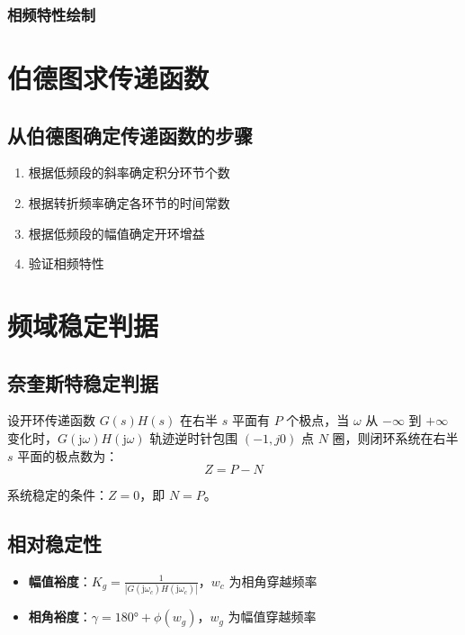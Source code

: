 \documentclass[12pt,a4paper]{article}
\newcommand{\jw}{\mathrm{j}\omega}
\begin{document}
\subsubsection{相频特性绘制}
\begin{center}
\end{center}

\section{伯德图求传递函数}

\subsection{从伯德图确定传递函数的步骤}
\begin{enumerate}
    \item 根据低频段的斜率确定积分环节个数
    \item 根据转折频率确定各环节的时间常数
    \item 根据低频段的幅值确定开环增益
    \item 验证相频特性
\end{enumerate}

\section{频域稳定判据}

\subsection{奈奎斯特稳定判据}
设开环传递函数 $G(s)H(s)$ 在右半 $s$ 平面有 $P$ 个极点，当 $\omega$ 从 $-\infty$ 到 $+\infty$ 变化时，$G(\jw)H(\jw)$ 轨迹逆时针包围 $(-1, j0)$ 点 $N$ 圈，则闭环系统在右半 $s$ 平面的极点数为：
\[Z = P - N\]

系统稳定的条件：$Z = 0$，即 $N = P$。

\subsection{相对稳定性}
\begin{itemize}
    \item \textbf{幅值裕度}：$K_g = \frac{1}{|G(\jw_c)H(\jw_c)|}$，$w_c$ 为相角穿越频率
    \item \textbf{相角裕度}：$\gamma = 180° + \phi(w_g)$，$w_g$ 为幅值穿越频率
\end{itemize}
\end{document}
